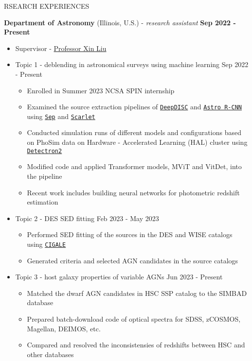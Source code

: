 \documentclass[11pt]{article}
\begin{document}
\begin{section}{RSEARCH EXPERIENCES}

\textbf{Department of Astronomy} (Illinois, U.S.) - \textit{research assistant} \hfill \textbf{Sep 2022 - Present}
\begin{itemize}[leftmargin=1.5em]
    \item Supervisor - \href{mailto:xinliuxl@illinois.edu}{Professor Xin Liu}
    \item Topic 1 - deblending in astronomical surveys using machine learning \hfill Sep 2022 - Present
    \begin{itemize}[leftmargin=1.5em]
        \item Enrolled in Summer 2023 NCSA SPIN internship
        \item Examined the source extraction pipelines of \href{https://github.com/burke86/deepdisc}{\texttt{DeepDISC}} and \href{https://github.com/burke86/astro_rcnn}{\texttt{Astro R-CNN}} using \href{https://github.com/kbarbary/sep/tree/v1.1.x}{\texttt{Sep}} and \href{https://github.com/pmelchior/scarlet}{\texttt{Scarlet}}
        \item Conducted simulation runs of different models and configurations based on PhoSim data on Hardware - Accelerated Learning (HAL) cluster using \href{https://github.com/facebookresearch/detectron2}{\texttt{Detectron2}}
        \item Modified code and applied Transformer models, MViT and VitDet, into the pipeline
        \item Recent work includes building neural networks for photometric redshift estimation 
    \end{itemize}
    \item Topic 2 - DES SED fitting \hfill Feb 2023 - May 2023
    \begin{itemize}[leftmargin=1.5em]
        \item Performed SED fitting of the sources in the DES and WISE catalogs using \href{https://cigale.lam.fr/}{\texttt{CIGALE}} 
        \item Generated criteria and selected AGN candidates in the source catalogs
    \end{itemize}
    \item Topic 3 - host galaxy properties of variable AGNs \hfill Jun 2023 - Present
    \begin{itemize}[leftmargin=1.5em]
        \item Matched the dwarf AGN candidates in HSC SSP catalog to the SIMBAD database 
        \item Prepared batch-download code of optical spectra for SDSS, zCOSMOS, Magellan, DEIMOS, etc. 
        \item Compared and resolved the inconsistensies of redshifts between HSC and other databases
    \end{itemize}
\end{itemize}


\end{section}
\end{document}

